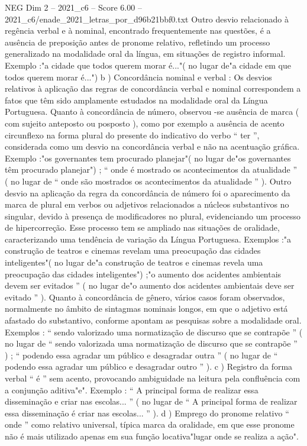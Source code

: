 \begin{textsample}{NEG Dim 2 – 2021\_c6 – Score 6.00 – 2021\_c6/enade\_2021\_letras\_por\_d96b21bbf0.txt}
Outro desvio relacionado à regência verbal e à nominal, encontrado frequentemente nas questões, é a ausência de preposição antes de pronome relativo, refletindo um processo generalizado na modalidade oral da língua, em situações de registro informal.
Exemplo :"a cidade que todos querem morar é..."( no lugar de"a cidade em que todos querem morar é...") b ) Concordância nominal e verbal : Os desvios relativos à aplicação das regras de concordância verbal e nominal correspondem a fatos que têm sido amplamente estudados na modalidade oral da Língua Portuguesa.
Quanto à concordância de número, observou -se ausência de marca ( com sujeito anteposto ou posposto ), como por exemplo a ausência de acento circunflexo na forma plural do presente do indicativo do verbo “ ter ”, considerada como um desvio na concordância verbal e não na acentuação gráfica.
Exemplo :"os governantes tem procurado planejar"( no lugar de"os governantes têm procurado planejar") ; “ onde é mostrado os acontecimentos da atualidade ” ( no lugar de “ onde são mostrados os acontecimentos da atualidade ” ).
Outro desvio na aplicação da regra da concordância de número foi o aparecimento da marca de plural em verbos ou adjetivos relacionados a núcleos substantivos no singular, devido à presença de modificadores no plural, evidenciando um processo de hipercorreção.
Esse processo tem se ampliado nas situações de oralidade, caracterizando uma tendência de variação da Língua Portuguesa.
Exemplos :"a construção de teatros e cinemas revelam uma preocupação das cidades inteligentes"( no lugar de"a construção de teatros e cinemas revela uma preocupação das cidades inteligentes") ;"o aumento dos acidentes ambientais devem ser evitados ” ( no lugar de"o aumento dos acidentes ambientais deve ser evitado ” ).
Quanto à concordância de gênero, vários casos foram observados, normalmente no âmbito de sintagmas nominais longos, em que o adjetivo está afastado do substantivo, conforme apontam as pesquisas sobre a modalidade oral.
Exemplos : “ sendo valorizado uma normatização de discurso que se contrapõe ” ( no lugar de “ sendo valorizada uma normatização de discurso que se contrapõe ” ) ; “ podendo essa agradar um público e desagradar outra ” ( no lugar de “ podendo essa agradar um público e desagradar outro ” ). c ) Registro da forma verbal “ é ” sem acento, provocando ambiguidade na leitura pela confluência com a conjunção aditiva"e".
Exemplo : “ A principal forma de realizar essa disseminação e criar nas escolas... ” ( no lugar de “ A principal forma de realizar essa disseminação é criar nas escolas... ” ). d ) Emprego do pronome relativo “ onde ” como relativo universal, típica marca da oralidade, em que esse pronome não é mais utilizado apenas em sua função locativa"lugar onde se realiza a ação".

\end{textsample}

